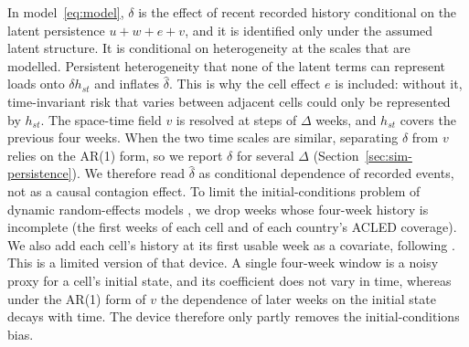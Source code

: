 In model~\eqref{eq:model}, $\delta$ is the effect of recent recorded history
conditional on the latent persistence $u + w + e + v$, and it is identified only
under the assumed latent structure. It is conditional on heterogeneity at the scales
that are modelled. Persistent heterogeneity that none of the latent terms can
represent loads onto $\delta h_{st}$ and inflates $\hat\delta$. This is why the
cell effect $e$ is included: without it, time-invariant risk that varies between
adjacent cells could only be represented by $h_{st}$.
The space-time field $v$ is resolved at steps of $\Delta$ weeks, and $h_{st}$ covers the previous four weeks. When the two time scales are
similar, separating $\delta$ from $v$ relies on the AR(1) form, so we report
$\delta$ for several $\Delta$ (Section~\ref{sec:sim-persistence}). We therefore read
$\hat\delta$ as conditional dependence of recorded events, not as a causal contagion
effect. To limit the initial-conditions problem of dynamic random-effects models
\citep{wooldridge2005initial}, we drop weeks whose four-week history is incomplete
(the first weeks of each cell and of each country's ACLED coverage). We also add each
cell's history at its first usable week as a covariate, following
\citet{wooldridge2005initial}. This is a limited version of that device. A single
four-week window is a noisy proxy for a cell's initial state, and its coefficient
does not vary in time, whereas under the AR(1) form of $v$ the dependence of later
weeks on the initial state decays with time. The device therefore only partly
removes the initial-conditions bias.
